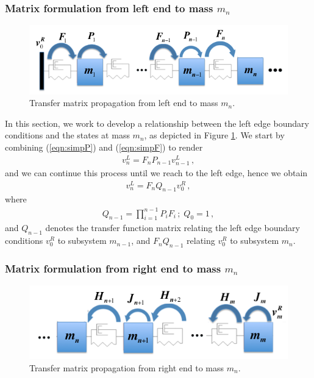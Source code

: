 \documentclass[11pt]{ucthesis}
\begin{document}
\subsubsection{Matrix formulation from left end to mass $m_n$}
\label{sec:Right}

\begin{figure}[thpb]
\centering
\includegraphics[width=1\linewidth]{Figures/left_to_n.png}
\caption{Transfer matrix propagation from left end to mass $m_n$.}
\label{left_2_n}
\end{figure}

In this section, we work to develop a relationship between the left edge boundary conditions and the states at mass $m_n$, as depicted in Figure \ref{left_2_n}. We start by combining  (\ref{eqn:simpP}) and (\ref{eqn:simpF}) to render
\begin{eqnarray}
v_{n}^L = F_{n} P_{n-1} v_{n-1}^L \,,
\label{eqn:propRight}
\end{eqnarray}
and we can continue this process until we reach to the left edge, hence we obtain
\begin{eqnarray}
v_n^L = F_n Q_{n-1} v_0^R \,,
\label{eqn:propQ}
\end{eqnarray}
where
\begin{eqnarray}
Q_{n-1}= \prod_{i=1}^{n-1}P_{i}F_{i} \,;\; Q_{0} = 1\,,
\end{eqnarray}
and $Q_{n-1}$ denotes the transfer function matrix relating the left edge boundary conditions $v_0^R$ to subsystem $m_{n-1}$, and $F_n Q_{n-1}$ relating $v_0^R$ to subsystem $m_n$.

\subsubsection{Matrix formulation from right end to mass $m_n$}
\label{sec:Left}

\begin{figure}[thpb]
\centering
\includegraphics[width=1\linewidth]{Figures/right_to_n.png}
\caption{Transfer matrix propagation from right end to mass $m_n$.}
\label{right_2_n}
\end{figure}
\end{document}
